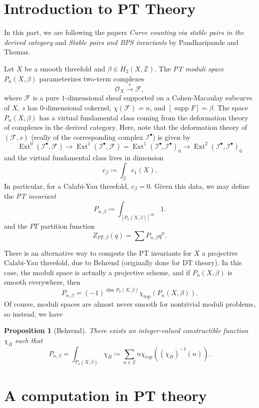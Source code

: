 \documentclass{amsart}
\newtheorem{prop}[thm]{Proposition}
\theoremstyle{definition}
\theoremstyle{remark}
\theoremstyle{plain}
\theoremstyle{definition}
\theoremstyle{remark}
\newcommand{\Z}{\mathbb{Z}}
\newcommand{\mc}[1]{\mathcal{#1}}
\newcommand{\mr}[1]{\mathrm{#1}}
\newcommand{\1}{\mathbf{1}}
\newcommand{\2}{\mathbf{2}}
\newcommand{\3}{\mathbf{3}}
\DeclareMathOperator{\Ext}{Ext}
\DeclareMathOperator{\supp}{supp}
\begin{document}
\section{Introduction to PT Theory}%
\label{sec:introduction_to_pt_theory}

In this part, we are following the papers \textit{Curve counting via stable pairs in the derived category} and \textit{Stable pairs and BPS invariants} by Pandharipande and Thomas.

Let $X$ be a smooth threefold and $\beta \in H_2(X, \Z)$. The \textit{PT moduli space} $P_n(X, \beta)$ parameterizes two-term complexes
\[ \mc{O}_X \xrightarrow{s} \mc{F}, \]
where $\mc{F}$ is a pure $1$-dimensional sheaf supported on a Cohen-Macaulay subcurve of $X$, $s$ has $0$-dimensional cokernel, $\chi(\mc{F}) = n$, and $[\supp F] = \beta$. The space $P_n(X, \beta)$ has a virtual fundamental class coming from the deformation theory of complexes in the derived category. Here, note that the deformation theory of $(\mc{F}, s)$ (really of the corresponding complex $\mc{I}^{\bullet}$) is given by
\[ \Ext^0(\mc{I}^{\bullet}, \mc{F}) \to \Ext^1(\mc{I}^{\bullet}, \mc{F}) = {\Ext^1(\mc{I}^{\bullet}, \mc{I}^{\bullet})}_0 \to {\Ext^2(\mc{I}^{\bullet}, \mc{I}^{\bullet})}_0 \]
and the virtual fundamental class lives in dimension
\[ c_{\beta} \coloneqq \int_{\beta} c_1(X). \]
In particular, for a Calabi-Yau threefold, $c_{\beta} = 0$. Given this data, we may define the \textit{PT invariant}
\[ P_{n, \beta} \coloneqq \int_{{[P_n(X, \beta)]}^{\mr{vir}}} 1. \]
and the $PT$ partition function
\[ Z_{PT, \beta}(q) = \sum P_{n, \beta} q^n. \]

There is an alternative way to compute the PT invariants for $X$ a projective Calabi-Yau threefold, due to Behrend (originally done for DT theory). In this case, the moduli space is actually a projective scheme, and if $P_n(X, \beta)$ is smooth everywhere, then
\[ P_{n, \beta} = {(-1)}^{\dim P_n(X, \beta)} \chi_{\mr{top}}(P_n(X, \beta)). \]
Of course, moduli spaces are almost never smooth for nontrivial moduli problems, so instead, we have
\begin{prop}[Behrend]
    There exists an integer-valued constructible function $\chi_B$ such that
    \[ P_{n, \beta} = \int_{P_n(X, \beta)} \chi_B \coloneqq \sum_{n \in \Z} n \chi_{\mr{top}}({(\chi_B)}^{-1}(n)). \]
\end{prop}

\section{A computation in PT theory}%
\label{sec:a_computation_in_pt_theory}
\end{document}
